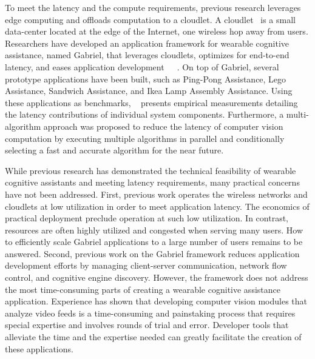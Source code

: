 To meet the latency and the compute requirements, previous research leverages
edge computing and offloads computation to a cloudlet. A
cloudlet~\cite{satyanarayanan2009case} is a small data-center located at the
edge of the Internet, one wireless hop away from users. Researchers have
developed an application framework for wearable cognitive assistance, named
Gabriel, that leverages cloudlets, optimizes for end-to-end latency, and eases
application
development~\cite{chen2018application}~\cite{ha2014towards}~\cite{chen2017empirical}.
On top of Gabriel, several prototype applications have been built, such as
Ping-Pong Assistance, Lego Assistance, Sandwich Assistance, and Ikea Lamp
Assembly Assistance. Using these applications as benchmarks,
~\cite{chen2017empirical} presents empirical measurements detailing the latency
contributions of individual system components. Furthermore, a multi-algorithm
approach was proposed to reduce the latency of computer vision computation by
executing multiple algorithms in parallel and conditionally selecting a fast and
accurate algorithm for the near future.

While previous research has demonstrated the technical feasibility of wearable
cognitive assistants and meeting latency requirements, many practical concerns
have not been addressed. First, previous work operates the wireless networks and
cloudlets at low utilization in order to meet application latency. The economics
of practical deployment preclude operation at such low utilization. In contrast,
resources are often highly utilized and congested when serving many users. How
to efficiently scale Gabriel applications to a large number of users remains to
be answered. Second, previous work on the Gabriel framework reduces application
development efforts by managing client-server communication, network flow
control, and cognitive engine discovery. However, the framework does not address
the most time-consuming parts of creating a wearable cognitive assistance
application. Experience has shown that developing computer vision modules that
analyze video feeds is a time-consuming and painstaking process that requires
special expertise and involves rounds of trial and error. Developer tools that
alleviate the time and the expertise needed can greatly facilitate the creation
of these applications.


